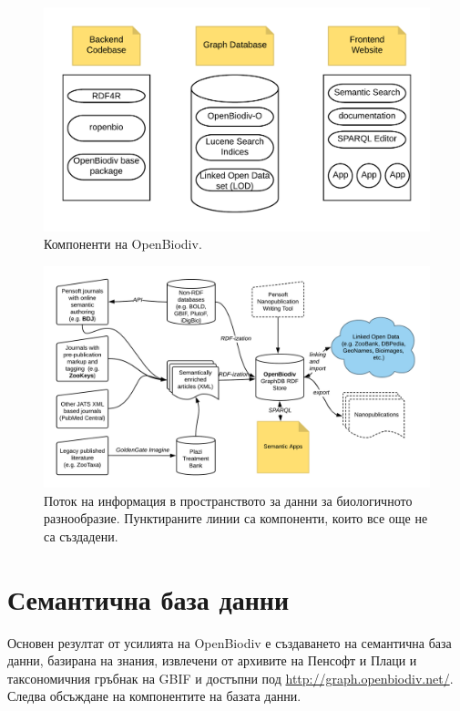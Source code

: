 \begin{figure}
\centering
\includegraphics[width=\textwidth]{Figures/components-openbiodiv}
\decoRule
\caption[OpenBiodiv Components]{Компоненти на OpenBiodiv.}
\label{fig:openbiodiv-components}
\end{figure}

\begin{figure}
\centering
\includegraphics[width=\textwidth]{Figures/openbiodiv-sources}
\decoRule
\caption[OpenBiodiv Components]{Поток на информация в пространството за данни за биологичното разнообразие. Пунктираните линии са компоненти, които все още не са създадени.}
\label{fig:openbiodiv-sources}
\end{figure}

\section{Семантична база данни}

Основен резултат от усилията на OpenBiodiv е създаването на семантична база данни, базирана на знания, извлечени от архивите на Пенсофт и Плаци и таксономичния гръбнак на GBIF и достъпни под \url{http://graph.openbiodiv.net/}. Следва обсъждане на компонентите на базата данни.

